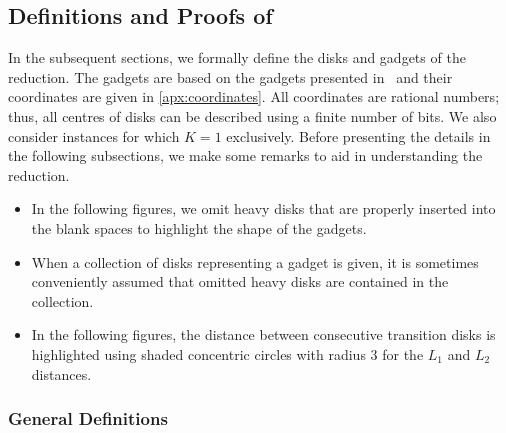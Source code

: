 \ifConf
\begin{toappendix}
\section{Definitions and Proofs of }
\else
\begin{toappendix}
\fi
In the subsequent sections, we formally define the disks and gadgets of the reduction.
The gadgets are based on the gadgets presented in~\cite{Breu1998} and their coordinates are given in \ref{apx:coordinates}.
All coordinates are rational numbers; thus, all centres of disks can be described using a finite number of bits.
We also consider instances for which $K=1$ exclusively.
Before presenting the details in the following subsections, we make some remarks to aid in understanding the reduction.
\begin{itemize}
    \item In the following figures, we omit heavy disks that are properly inserted into the blank spaces to highlight the shape of the gadgets.
    \item When a collection of disks representing a gadget is given, it is sometimes conveniently assumed that omitted heavy disks are contained in the collection.
    \item In the following figures, the distance between consecutive transition disks is highlighted using shaded concentric circles with radius $3$ for the $L_1$ and $L_2$ distances.
\end{itemize}


\subsubsection{General Definitions}


\end{toappendix}
\end{toappendix}
